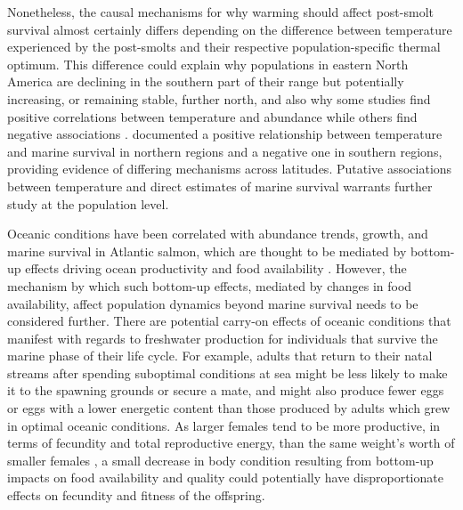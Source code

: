 \documentclass[12pt]{article}
\begin{document}
Nonetheless, the causal mechanisms for why warming should affect post-smolt
survival almost certainly differs depending on the difference between
temperature experienced by the post-smolts and their respective
population-specific thermal optimum.
This difference could explain why populations in eastern North America are
declining in the southern part of their range but potentially increasing, or
remaining stable,
further north, and also why some studies find positive correlations between
temperature and abundance \citep{Friedland1998, Friedland1998b, Jonsson2004}
while others find negative associations \citep{Friedland1993, Todd2008}.
\citet{Olmos2020} documented a positive relationship between temperature and marine survival
in northern regions and a negative one in southern regions, providing
evidence of differing mechanisms across latitudes.
Putative associations between temperature and direct estimates of marine
survival warrants further study at the population level.

Oceanic conditions have been correlated with abundance trends, growth, and
marine survival in Atlantic salmon, which are thought to be mediated by
bottom-up effects driving ocean productivity and food availability
\citep{Todd2008, Renkawitz2015,Olmos2020}.
However, the mechanism by which such bottom-up effects, mediated by changes in
food availability, affect population dynamics beyond marine survival needs to
be considered further.
There are potential carry-on effects of oceanic conditions that manifest with
regards to freshwater production for individuals that survive the marine phase
of their life cycle.
For example, adults that return to their natal streams after spending
suboptimal conditions at sea might be less likely to make it to the spawning
grounds or secure a mate, and might also produce fewer eggs or eggs with a
lower energetic content than those produced by adults which grew in optimal
oceanic conditions.
As larger females tend to be more productive, in terms of fecundity and total
reproductive energy, than the same weight's worth of smaller females
\citep{Barneche2018}, a small decrease in body condition resulting from bottom-up
impacts on food availability and quality could potentially have
disproportionate effects on fecundity and fitness of the offspring.

\end{document}
